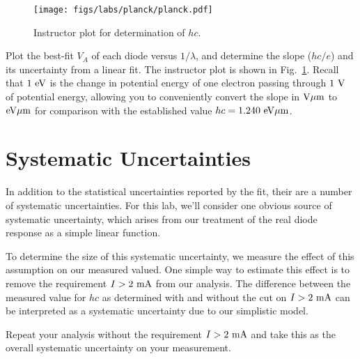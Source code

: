 \begin{figure}[htbp]
\begin{center}
\texttt{[image: figs/labs/planck/planck.pdf]} \\
\end{center}
\caption{Instructor plot for determination of $hc$.}
\label{fig:planckfit}
\end{figure}

Plot the best-fit $V_A$ of each diode versus $1/\lambda$, and
determine the slope ($hc/e$) and its uncertainty from a linear
fit.  The instructor plot is shown in Fig.~\ref{fig:planckfit}.
Recall that $1~\rm eV$ is the change in potential energy of one
electron passing through $1~\rm V$ of potential energy, allowing you
to conveniently convert the slope in $\rm V \mu m$ to $\rm eV \mu m$ for
comparison with the established value $hc = 1.240~\rm eV \mu m$.

\section{Systematic Uncertainties}

In addition to the statistical uncertainties reported by the fit,
their are a number of systematic uncertainties.  For this lab, we'll
consider one obvious source of systematic uncertainty, which arises
from our treatment of the real diode response as a simple linear
function.

To determine the size of this systematic uncertainty, we measure the
effect of this assumption on our measured valued.  One simple way to
estimate this effect is to remove the requirement $I>2~\rm mA$ from
our analysis.  The difference between the measured value for $hc$ as
determined with and without the cut on $I>2~\rm mA$ can be interpreted
as a systematic uncertainty due to our simplistic model.

Repeat your analysis without the requirement $I > 2~\rm mA$ and take
this as the overall systematic uncertainty on your measurement.














